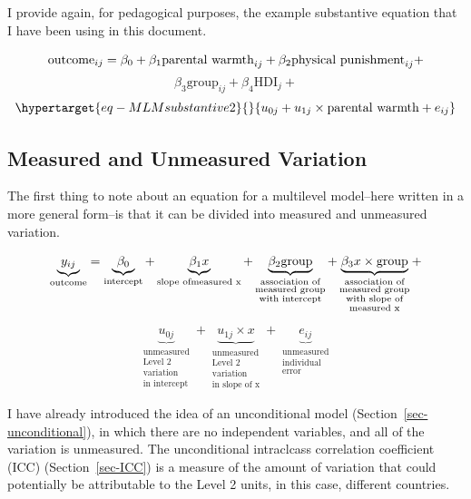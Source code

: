\documentclass[
  letterpaper,
  DIV=11,
  numbers=noendperiod]{scrreprt}
\begin{document}
I provide again, for pedagogical purposes, the example substantive
equation that I have been using in this document.

\[\text{outcome}_{ij} = \beta_0 + \beta_1 \text{parental warmth}_{ij} + \\ \beta_2 \text{physical punishment}_{ij} +\]
\[\beta_3 \text{group}_{ij} + \beta_4 \text{HDI}_{j} + \]
\begin{equation}\protect\hypertarget{eq-MLMsubstantive2}{}{u_{0j} + u_{1j} \times \text{parental warmth} + e_{ij}}\label{eq-MLMsubstantive2}\end{equation}

\hypertarget{measured-and-unmeasured-variation}{%
\subsection{Measured and Unmeasured
Variation}\label{measured-and-unmeasured-variation}}

The first thing to note about an equation for a multilevel model--here
written in a more general form--is that it can be divided into measured
and unmeasured variation.

\[\underbrace{y_{ij}}_\text{outcome} = \underbrace{\beta_0}_\text{intercept} + \underbrace{\beta_1 x}_{\text{slope of} \\ \text{measured x}} + \underbrace{\beta_2 \text{group}}_{\substack{\text{association of} \\ \text{measured group} \\ \text{with intercept}}} + \underbrace{\beta_3 x \times \text{group}}_{\substack{\text{association of} \\ \text{measured group} \\ \text{with slope of} \\  \text{measured x}}} + \]

\[\underbrace{u_{0j}}_{\substack{\text{unmeasured} \\ \text{Level 2} \\ \text{variation} \\ \text{in intercept}}} + \underbrace{u_{1j} \times x}_{\substack{\text{unmeasured} \\ \text{Level 2} \\ \text{variation} \\ \text{in slope of x}}} + \underbrace{e_{ij}}_{\substack{\text{unmeasured} \\ \text{individual} \\ \text{error}}}\]

I have already introduced the idea of an unconditional model
(Section~\ref{sec-unconditional}), in which there are no independent
variables, and all of the variation is unmeasured. The unconditional
intraclcass correlation coefficient (ICC) (Section~\ref{sec-ICC}) is a
measure of the amount of variation that could potentially be
attributable to the Level 2 units, in this case, different countries.
\end{document}

